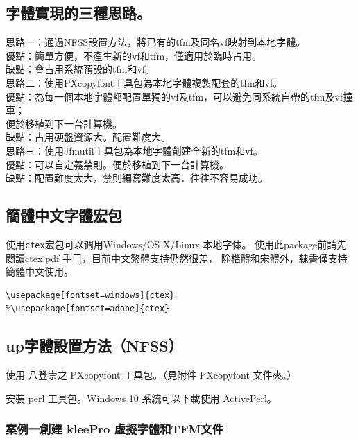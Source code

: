 \subsection{字體實現的三種思路。}
\par\noindent
思路一：通過NFSS設置方法，將已有的tfm及同名vf映射到本地字體。\\
優點：簡單方便，不產生新的vf和tfm，僅適用於臨時占用。\\
缺點：會占用系統預設的tfm和vf。\\[5mm]
思路二：使用PXcopyfont工具包為本地字體複製配套的tfm和vf。\\
優點：為每一個本地字體都配置單獨的vf及tfm，可以避免同系統自帶的tfm及vf撞車；\\
\hspace{3zw}便於移植到下一台計算機。\\
缺點：占用硬盤資源大。配置難度大。\\[5mm]
思路三：使用Jfmutil工具包為本地字體創建全新的tfm和vf。\\
優點：可以自定義禁則。便於移植到下一台計算機。\\
缺點：配置難度太大，禁則編寫難度太高，往往不容易成功。


\subsection{簡體中文字體宏包}
\par
使用\verb+ctex+宏包可以调用Windows/OS X/Linux 本地字体。
使用此package前請先閲讀ctex.pdf 手冊，目前中文繁體支持仍然很差，
除楷體和宋體外，隸書僅支持簡體中文使用。
\begin{lstlisting}[firstnumber=1]
\usepackage[fontset=windows]{ctex}
%\usepackage[fontset=adobe]{ctex}
\end{lstlisting}


\subsection{{up\LaTeXe}字體設置方法（NFSS）}

\par{}使用 八登崇之 PXcopyfont 工具包。（見附件 PXcopyfont 文件夾。）
\par{}安裝 perl 工具包。Windows 10 系統可以下載使用 {ActivePerl}。

\subsubsection*{案例一創建 {kleePro} 虛擬字體和TFM文件}

